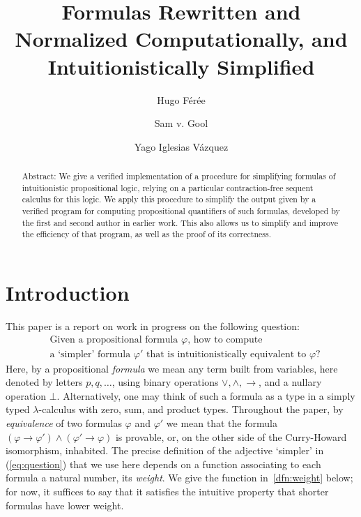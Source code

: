 \documentclass[english,final]{jflart}
\title{Formulas Rewritten and Normalized Computationally, and Intuitionistically Simplified}
\author[1]{Hugo Férée}
\author[1]{Sam v. Gool}
\author[1]{Yago Iglesias Vázquez}
\affil[1]{IRIF, Université Paris Cité, Paris, 75013, France}
\theoremstyle{definition}
\theoremstyle{plain}
\renewcommand{\phi}{\varphi}
\begin{document}
\maketitle

\begin{abstract}
Abstract: We give a verified implementation of a procedure for simplifying formulas of  intuitionistic propositional logic, relying on a particular contraction-free sequent calculus for this logic. We apply this procedure to simplify the output given by a verified program for computing propositional quantifiers of such formulas, developed by the first and second author in earlier work. This also allows us to simplify and improve the efficiency of that program, as well as the proof of its correctness.
\end{abstract}

\section{Introduction}

This paper is a report on work in progress on the following question: 
\begin{equation}\label{eq:question}
\begin{aligned}
&\text{Given a propositional formula $\phi$, how to compute } \\
&\text{a `simpler' formula $\phi'$ that is intuitionistically equivalent to $\phi$?}
\end{aligned}
\end{equation}
Here, by a propositional \emph{formula} we mean any term built from variables, here denoted by letters $p, q, \dots$, using binary operations $\vee, \wedge, \to$, and a nullary operation $\bot$. Alternatively, one may think of such a formula as a type in a simply typed $\lambda$-calculus with zero, sum, and product types. Throughout the paper, by \emph{equivalence} of two formulas $\phi$ and $\phi'$ we mean that the formula $(\phi \to \phi') \wedge (\phi' \to \phi)$ is provable, or, on the other side of the Curry-Howard isomorphism, inhabited. The precise definition of the adjective `simpler' in (\ref{eq:question}) that we use here depends on a function associating to each formula a natural number, its \emph{weight}. We give the function in~\cref{dfn:weight} below; for now, it suffices to say that it satisfies the intuitive property that shorter formulas have lower weight.
\end{document}
